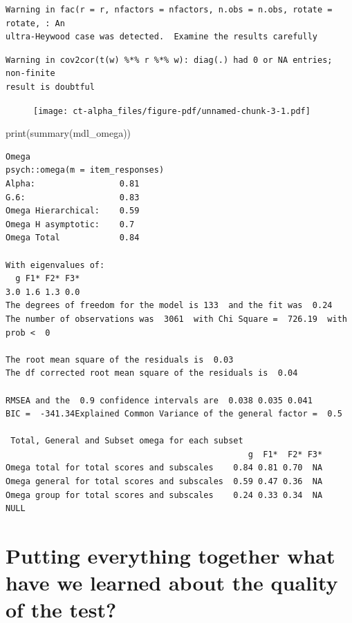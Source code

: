 \documentclass[
  letterpaper,
  DIV=11,
  numbers=noendperiod]{scrreprt}
\newenvironment{Shaded}{\begin{snugshade}}{\end{snugshade}}
\newcommand{\FunctionTok}[1]{\textcolor[rgb]{0.28,0.35,0.67}{#1}}
\newcommand{\NormalTok}[1]{\textcolor[rgb]{0.00,0.23,0.31}{#1}}
\begin{document}
\begin{verbatim}
Warning in fac(r = r, nfactors = nfactors, n.obs = n.obs, rotate = rotate, : An
ultra-Heywood case was detected.  Examine the results carefully
\end{verbatim}

\begin{verbatim}
Warning in cov2cor(t(w) %*% r %*% w): diag(.) had 0 or NA entries; non-finite
result is doubtful
\end{verbatim}

\begin{figure}[H]

{\centering \texttt{[image: ct-alpha\_files/figure-pdf/unnamed-chunk-3-1.pdf]}

}

\end{figure}

\begin{Shaded}
\begin{Highlighting}[]
\FunctionTok{print}\NormalTok{(}\FunctionTok{summary}\NormalTok{(mdl\_omega))}
\end{Highlighting}
\end{Shaded}

\begin{verbatim}
Omega 
psych::omega(m = item_responses)
Alpha:                 0.81 
G.6:                   0.83 
Omega Hierarchical:    0.59 
Omega H asymptotic:    0.7 
Omega Total            0.84 

With eigenvalues of:
  g F1* F2* F3* 
3.0 1.6 1.3 0.0 
The degrees of freedom for the model is 133  and the fit was  0.24 
The number of observations was  3061  with Chi Square =  726.19  with prob <  0 

The root mean square of the residuals is  0.03 
The df corrected root mean square of the residuals is  0.04 

RMSEA and the  0.9 confidence intervals are  0.038 0.035 0.041
BIC =  -341.34Explained Common Variance of the general factor =  0.5 

 Total, General and Subset omega for each subset
                                                 g  F1*  F2* F3*
Omega total for total scores and subscales    0.84 0.81 0.70  NA
Omega general for total scores and subscales  0.59 0.47 0.36  NA
Omega group for total scores and subscales    0.24 0.33 0.34  NA
NULL
\end{verbatim}

\hypertarget{putting-everything-together-what-have-we-learned-about-the-quality-of-the-test}{%
\section{Putting everything together what have we learned about the
quality of the
test?}\label{putting-everything-together-what-have-we-learned-about-the-quality-of-the-test}}
\end{document}

